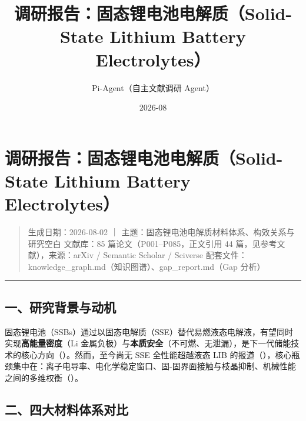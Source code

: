 \documentclass[12pt,a4paper]{ctexart}
\title{ 调研报告：固态锂电池电解质（Solid-State Lithium Battery Electrolytes） }
\date{ 2026-08 }
\author{Pi-Agent（自主文献调研 Agent）}
\begin{document}
\maketitle
\sloppy  %

\section{调研报告：固态锂电池电解质（Solid-State Lithium Battery Electrolytes）}\label{ux8c03ux7814ux62a5ux544aux56faux6001ux9502ux7535ux6c60ux7535ux89e3ux8d28solid-state-lithium-battery-electrolytes}

\begin{quote}
生成日期：2026-08-02 ｜ 主题：固态锂电池电解质材料体系、构效关系与研究空白 文献库：85 篇论文（P001--P085，正文引用 44 篇，见参考文献），来源：arXiv / Semantic Scholar / Sciverse 配套文件：knowledge\_graph.md（知识图谱）、gap\_report.md（Gap 分析）
\end{quote}

\begin{center}\rule{0.5\linewidth}{0.5pt}\end{center}

\subsection{一、研究背景与动机}\label{ux4e00ux7814ux7a76ux80ccux666fux4e0eux52a8ux673a}

固态锂电池（SSBs）通过以固态电解质（SSE）替代易燃液态电解液，有望同时实现\textbf{高能量密度}（Li 金属负极）与\textbf{本质安全}（不可燃、无泄漏），是下一代储能技术的核心方向（\cite{P002,P004,P006}）。然而，至今尚无 SSE 全性能超越液态 LIB 的报道（\cite{P002}），核心瓶颈集中在：离子电导率、电化学稳定窗口、固-固界面接触与枝晶抑制、机械性能之间的多维权衡（\cite{P006,P012}）。

\subsection{二、四大材料体系对比}\label{ux4e8cux56dbux5927ux6750ux6599ux4f53ux7cfbux5bf9ux6bd4}
\end{document}

